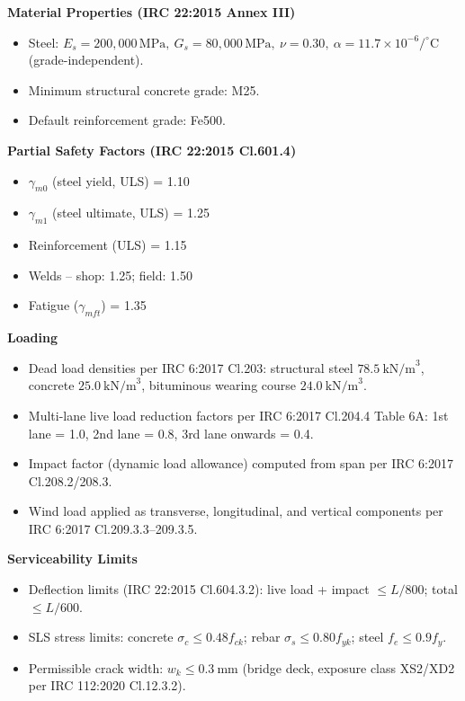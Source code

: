 \documentclass[12pt,a4paper]{report}
\numberwithin{table}{chapter}
\numberwithin{figure}{chapter}
\begin{document}
\textbf{Material Properties (IRC 22:2015 Annex III)}

\begin{itemize}
\item Steel: $E_s = 200{,}000 \, \text{MPa}, \ G_s = 80{,}000 \, \text{MPa}, \ \nu = 0.30, \ \alpha = 11.7 \times 10^{-6}/^\circ\mathrm{C}$ (grade-independent).
\item Minimum structural concrete grade: M25.
\item Default reinforcement grade: Fe500.
\end{itemize}

\textbf{Partial Safety Factors (IRC 22:2015 Cl.601.4)}

\begin{itemize}
\item $\gamma_{m0}$ (steel yield, ULS) = 1.10
\item $\gamma_{m1}$ (steel ultimate, ULS) = 1.25
\item Reinforcement (ULS) = 1.15
\item Welds -- shop: 1.25; field: 1.50
\item Fatigue ($\gamma_{mft}$) = 1.35
\end{itemize}

\textbf{Loading}

\begin{itemize}
\item Dead load densities per IRC 6:2017 Cl.203: structural steel $78.5 \ \text{kN/m}^3$, concrete $25.0 \ \text{kN/m}^3$, bituminous wearing course $24.0 \ \text{kN/m}^3$.
\item Multi-lane live load reduction factors per IRC 6:2017 Cl.204.4 Table 6A: 1st lane = 1.0, 2nd lane = 0.8, 3rd lane onwards = 0.4.
\item Impact factor (dynamic load allowance) computed from span per IRC 6:2017 Cl.208.2/208.3.
\item Wind load applied as transverse, longitudinal, and vertical components per IRC 6:2017 Cl.209.3.3--209.3.5.
\end{itemize}

\textbf{Serviceability Limits}

\begin{itemize}
\item Deflection limits (IRC 22:2015 Cl.604.3.2): live load + impact $\leq L/800$; total $\leq L/600$.
\item SLS stress limits: concrete $\sigma_c \leq 0.48 f_{ck}$; rebar $\sigma_s \leq 0.80 f_{yk}$; steel $f_e \leq 0.9 f_y$.
\item Permissible crack width: $w_k \leq 0.3 \ \text{mm}$ (bridge deck, exposure class XS2/XD2 per IRC 112:2020 Cl.12.3.2).
\end{itemize}
\end{document}
